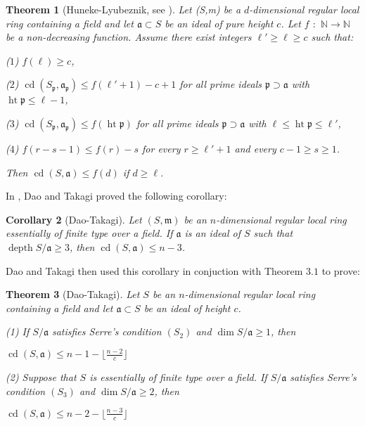 \documentclass[11pt]{amsart}
\numberwithin{equation}{section}
\newtheorem{theorem}{Theorem}[section]
\newtheorem{cor}[theorem]{Corollary}
\theoremstyle{definition}
\theoremstyle{remark}
\newcommand{\cd}{\operatorname{cd}}
\newcommand{\height}{\operatorname{ht}}
\newcommand{\depth}{\operatorname{depth}}
\begin{document}
\begin{theorem}[{Huneke-Lyubeznik, see \cite[Theorem 3.7]{DT16}}]
Let (S,m) be a $d$-dimensional regular local ring containing a field and let $\mathfrak{a} \subset S$ be an ideal of pure height $c$. Let $f$ $:$ $\mathds{N} \rightarrow \mathds{N}$ be a non-decreasing function. Assume there exist integers $\ell' \geq \ell \geq c$ such that:

($1$) $f(\ell) \geq c$,

($2$) $\cd (S_\mathfrak{p},\mathfrak{a}_\mathfrak{p}) \leq f(\ell'+1)-c+1$ for all prime ideals $\mathfrak{p} \supset \mathfrak{a}$ with $\height \mathfrak{p} \leq \ell-1$,

($3$) $\cd (S_\mathfrak{p},\mathfrak{a}_\mathfrak{p}) \leq f(\height \mathfrak{p})$ for all prime ideals $\mathfrak{p} \supset \mathfrak{a}$ with $\ell \leq \height \mathfrak{p} \leq \ell'$,

($4$) $f(r-s-1) \leq f(r) - s$ for every $r \geq \ell' + 1 $ and every $c-1 \geq s \geq 1$.

Then $\cd (S,\mathfrak{a}) \leq f(d)$ if $d \geq \ell$.
\end{theorem}

In \cite{DT16}, Dao and Takagi proved the following corollary:

\begin{cor}[Dao-Takagi]
Let $(S,\mathfrak{m})$ be an $n$-dimensional regular local ring essentially of finite type over a field. If $\mathfrak{a}$ is an ideal of $S$ such that $\depth S/\mathfrak{a} \geq 3$, then $\cd (S,\mathfrak{a}) \leq n-3$.
\end{cor}

Dao and Takagi then used this corollary in conjuction with Theorem $3.1$ to prove:

\begin{theorem}[Dao-Takagi]
Let $S$ be an $n$-dimensional regular local ring containing a field and let $\mathfrak{a} \subset S$ be an ideal of height $c$.

(1) If $S/\mathfrak{a}$ satisfies Serre's condition $(S_2)$ and $\dim S/\mathfrak{a} \geq 1$, then

\begin{center}
$\cd (S,\mathfrak{a}) \leq n-1-\lfloor \frac{n-2}{c} \rfloor$
\end{center}

(2) Suppose that $S$ is essentially of finite type over a field. If $S/\mathfrak{a}$ satisfies Serre's condition $(S_3)$ and $\dim S/\mathfrak{a} \geq 2$, then

\begin{center}
$\cd (S,\mathfrak{a}) \leq n-2-\lfloor \frac{n-3}{c} \rfloor$
\end{center}

\end{theorem}
\end{document}
